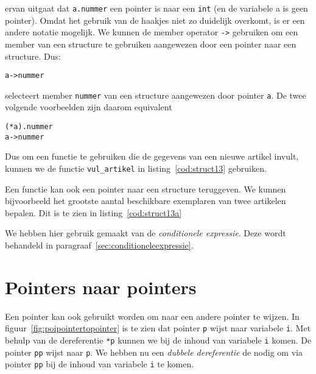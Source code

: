ervan uitgaat dat \texttt{a.nummer} een pointer is naar een \texttt{int} (en de variabele a is geen pointer).
Omdat het gebruik van de haakjes niet zo duidelijk overkomt, is er een andere notatie mogelijk. We kunnen de member operator \texttt{->}\indexop{->} gebruiken om een member van een structure te gebruiken aangewezen door een pointer naar een structure. Dus:

\hspace*{1em}\texttt{a->nummer}

selecteert member \texttt{nummer} van een structure aangewezen door pointer \texttt{a}. De twee volgende voorbeelden zijn daarom equivalent

\hspace*{1em}\texttt{(*a).nummer}\\
\hspace*{1em}\texttt{a->nummer}

Dus om een functie te gebruiken die de gegevens van een nieuwe artikel invult, kunnen we de functie \texttt{vul\_artikel} in listing~\ref{cod:struct13} gebruiken.


Een functie kan ook een pointer naar een structure teruggeven. We kunnen bijvoorbeeld het grootste aantal beschikbare exemplaren van twee artikelen bepalen. Dit is te zien in listing~\ref{cod:struct13a}


We hebben hier gebruik gemaakt van de \textsl{conditionele expressie}. Deze wordt behandeld in paragraaf~\ref{sec:conditioneleexpressie}.


\section{Pointers naar pointers}
\label{sec:pointersnaarpointers}
Een pointer kan ook gebruikt worden om naar een andere pointer te wijzen. In figuur~\ref{fig:poipointertopointer} is te zien dat pointer \texttt{p} wijst naar variabele \texttt{i}. Met behulp van de dereferentie \texttt{*p} kunnen we bij de inhoud van variabele \texttt{i} komen. De pointer \texttt{pp} wijst naar \texttt{p}. We hebben nu een \textsl{dubbele dereferentie} de nodig om via pointer \texttt{pp} bij de inhoud van variabele \texttt{i} te komen. 


